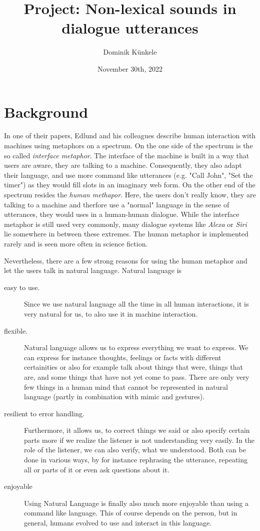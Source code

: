 \documentclass[
	11pt, %
]{fphw}
\title{Project: Non-lexical sounds in dialogue utterances} %
\date{November 30th, 2022} %
\author{Dominik Künkele}
\institute{University of Gothenburg} %
\begin{document}
\maketitle %


\section*{Background}
In one of their papers, Edlund and his colleagues describe human interaction with machines using metaphors on a spectrum. On the one side of the spectrum is the so called \emph{interface metaphor}. The interface of the machine is built in a way that users are aware, they are talking to a machine. Consequently, they also adapt their language, and use more command like utterances (e.g. "Call John", "Set the timer") as they would fill slots in an imaginary web form. On the other end of the spectrum resides the \emph{human methapor}. Here, the users don't really know, they are talking to a machine and therfore use a "normal" language in the sense of utterances, they would uses in a human-human dialogue. While the interface metaphor is still used very commonly, many dialogue systems like \emph{Alexa} or \emph{Siri} lie somewhere in between these extremes. The human metaphor is implemented rarely and is seen more often in science fiction. 

Nevertheless, there are a few strong reasons for using the human metaphor and let the users talk in natural language. Natural language is 
\begin{description}
    \item[easy to use.] Since we use natural language all the time in all human interactions, it is very natural for us, to also use it in machine interaction. 
    \item[flexible.] Natural language allows us to express everything we want to express. We can express for instance thoughts, feelings or facts with different certainities or also for example talk about things that were, things that are, and some things that have not yet come to pass. There are only very few things in a human mind that cannot be represented in natural language (partly in combination with mimic and gestures).  
    \item[resilient to error handling.] Furthermore, it allows us, to correct things we said or also specify certain parts more if we realize the listener is not understanding very easily. In the role of the listener, we can also verify, what we understood. Both can be done in various ways, by for instance rephrasing the utterance, repeating all or parts of it or even ask questions about it.
    \item[enjoyable] Using Natural Language is finally also much more enjoyable than using a command like language. This of course depends on the person, but in general, humans evolved to use and interact in this language.
\end{description}
\end{document}
